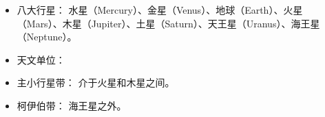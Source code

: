 
\begin{issues}
\issueDraft
\end{issues}

\begin{itemize}
\item 八大行星： 水星（Mercury）、金星（Venus）、地球（Earth）、火星（Mars）、木星（Jupiter）、土星（Saturn）、天王星（Uranus）、海王星（Neptune）。
\item 天文单位： 
\item 主小行星带： 介于火星和木星之间。
\item 柯伊伯带： 海王星之外。
\end{itemize}
